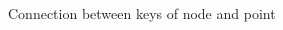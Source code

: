 \begin{frame}
    \begin{figure}
        \centering
        \begin{animateinline}[controls={step,play,stop},buttonsize=10pt]{.5}
        \end{animateinline}
        \caption{Connection between keys of node and point}
    \end{figure}
\end{frame}
